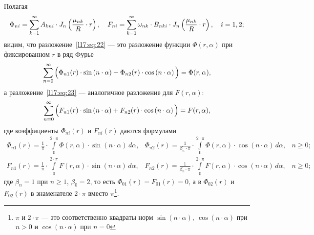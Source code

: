Полагая 
\begin{equation}\label{l17:eq:24}
	\hfill\Phi_{ni}=\sum\limits_{k=1}^{\infty}A_{kni}\cdot J_{n}\left(\frac{\mu_{nk}}{R}\cdot r\right),\quad F_{ni}=\sum\limits_{k=1}^{\infty}\omega_{nk}\cdot B_{nki}\cdot J_{n}\left(\frac{\mu_{nk}}{R}\cdot r\right),\quad i=1,2;\hfill
\end{equation}
видим, что разложение~\eqref{l17:eq:22} --- это разложение функции $\Phi(r,\alpha)$ при фиксированном $r$ в ряд Фурье
\begin{equation*}
	\hfill\sum\limits_{n=0}^{\infty}\Big(\Phi_{n1}(r)\cdot\sin\left(n\cdot\alpha\right)+\Phi_{n2}(r)\cdot\cos\left(n\cdot\alpha\right)\Big)=\Phi(r,\alpha),\hfill
\end{equation*}
а разложение~\eqref{l17:eq:23} --- аналогичное разложение для $F(r,\alpha)$:
\begin{equation*}
	\hfill\sum\limits_{n=0}^{\infty}\Big(F_{n1}(r)\cdot\sin\left(n\cdot\alpha\right)+F_{n2}(r)\cdot\cos\left(n\cdot\alpha\right)\Big)=F(r,\alpha),\hfill
\end{equation*}
где коэффициенты $\Phi_{ni}(r)$ и $F_{ni}(r)$ даются формулами
\begin{equation}\label{l17:eq:25}
	\begin{array}{ccc}
		\displaystyle\Phi_{n1}(r)=\frac{1}{\pi}\cdot\int\limits_{0}^{2\cdot\pi}\Phi(r,\alpha)\cdot\sin\left(n\cdot\alpha\right)\,d\alpha,&\displaystyle\Phi_{n2}(r)=\frac{1}{\beta_n\cdot\pi}\cdot\int\limits_{0}^{2\cdot\pi}\Phi(r,\alpha)\cdot\cos\left(n\cdot\alpha\right)\,d\alpha,&n\geqslant0;\\[18pt]
		\displaystyle F_{n1}(r)=\frac{1}{\pi}\cdot\int\limits_{0}^{2\cdot\pi}F(r,\alpha)\cdot\sin\left(n\cdot\alpha\right)\,d\alpha,&\displaystyle F_{n2}(r)=\frac{1}{\beta_n\cdot\pi}\cdot\int\limits_{0}^{2\cdot\pi}F(r,\alpha)\cdot\cos\left(n\cdot\alpha\right)\,d\alpha,&n\geqslant0;
	\end{array}
\end{equation}
где $\beta_n=1$ при $n\geqslant1$, $\beta_0=2$, то есть $\Phi_{01}(r)=F_{01}(r)=0$, а в $\Phi_{02}(r)$ и $F_{02}(r)$ в знаменателе $2\cdot\pi$ вместо $\pi$\footnote{$\pi$ и $2\cdot\pi$ --- это соответственно квадраты норм $\sin(n\cdot\alpha),\ \cos(n\cdot\alpha)$ при $n>0$ и $\cos(n\cdot\alpha)$ при $n=0$}.

